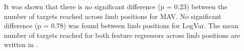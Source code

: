 \begin{multicols}{2}
	
	
	It was shown that there is no significant difference (p = 0.23) between the number of targets reached across limb positions for MAV. No significant difference (p = 0.78) was found between limb positions for LogVar. The mean number of targets reached for both feature regressors across limb positions are written in .
	
	
	
%	
		

\end{multicols}
